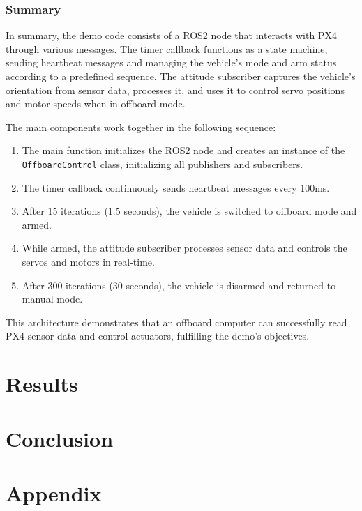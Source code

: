 \documentclass[a4paper]{article}
\begin{document}


\subsubsection{Summary}

In summary, the demo code consists of a ROS2 node that interacts with PX4 through various messages. The timer callback functions as a state machine, sending heartbeat messages and managing the vehicle's mode and arm status according to a predefined sequence. The attitude subscriber captures the vehicle's orientation from sensor data, processes it, and uses it to control servo positions and motor speeds when in offboard mode.

The main components work together in the following sequence:

\begin{enumerate}
    \item The main function initializes the ROS2 node and creates an instance of the \verb|OffboardControl| class, initializing all publishers and subscribers. 
    \item The timer callback continuously sends heartbeat messages every 100ms. 
    \item After 15 iterations (1.5 seconds), the vehicle is switched to offboard mode and armed. 
    \item While armed, the attitude subscriber processes sensor data and controls the servos and motors in real-time. 
    \item After 300 iterations (30 seconds), the vehicle is disarmed and returned to manual mode. 
\end{enumerate}

This architecture demonstrates that an offboard computer can successfully read PX4 sensor data and control actuators, fulfilling the demo's objectives.

\clearpage
\section{Results}



\clearpage
\section{Conclusion}



\clearpage
\section{Appendix}
\label{code::offboard_control.cpp}




\end{document}
